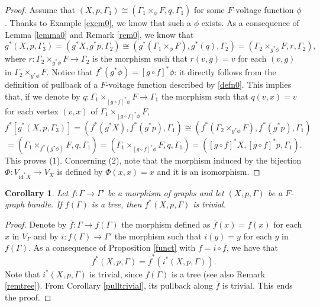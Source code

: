 \documentclass{amsart}
\newtheorem{cor}[theo]{Corollary}
\theoremstyle{definition}
\numberwithin{equation}{section}
\begin{document}
\begin{proof}
Assume that $(X, p, \Gamma_1) \cong (\Gamma_1 \times_\phi F, q, \Gamma_1)$ for some $F$-voltage function $\phi$. Thanks to Example \ref{exem0}, we know that such a $\phi$ exists.
As a consequence of Lemma \ref{lemma0} and Remark \ref{rem0}, we know that
\begin{equation}
g^*(X, p, \Gamma_3) = (g^*X, g^*p, \Gamma_2) \cong (g^*(\Gamma_1 \times_\phi F), g^*(q), \Gamma_2) = (\Gamma_2 \times_{g^*\phi} F, r, \Gamma_2),
\end{equation}
where $r: \Gamma_2 \times_{g^*\phi} F \longrightarrow \Gamma_2$ is the morphism such that $r(v, g) = v$ for each $(v,g)$ in $\Gamma_2 \times_{g^*\phi} F$.
Notice that $f^*(g^*\phi) = [g \circ f]^*\phi$: it directly follows from the definition of pullback of a $F$-voltage function described by \eqref{defn0}. This implies that, if we denote by $q: \Gamma_1 \times_{[g \circ f]^*\phi} F \longrightarrow \Gamma_1$ the morphism such that $q(v, x) = v$ for each vertex $(v,x)$ of $\Gamma_1 \times_{[g \circ f]^*\phi} F$,
\begin{equation}
    f^*[g^*(X, p, \Gamma_3)] = (f^*(g^*X), f^*(g^*p), \Gamma_1) \cong (f^*(\Gamma_2 \times_{g^*\phi} F), f^*(g^*p), \Gamma_1)\end{equation}
 \[   = (\Gamma_1 \times_{f^*(g^*\phi)} F, q, \Gamma_1)    = (\Gamma_1 \times_{[g \circ f]^*\phi} F, q, \Gamma_1) = ([g \circ f]^*X, [g \circ f]^*p, \Gamma_1).\]
This proves (1). Concerning (2), note that the morphism induced by the bijection $\Phi: V_{\mathrm{id}^*X} \longrightarrow V_X$ is defined by $\Phi(x,x)=x$  and it is  an isomorphism.
\end{proof}

\begin{cor}
Let $f: \Gamma \longrightarrow \Gamma'$ be a morphism of graphs and let $(X, p, \Gamma)$ be a $F$-graph bundle. If $f(\Gamma)$ is a tree, then $f^*(X, p, \Gamma)$ is trivial.    
\end{cor}
\begin{proof}
Denote by $\overline{f}:\Gamma \longrightarrow f(\Gamma)$ the morphism defined as $\overline{f}(x) = f(x)$ for each $x$ in $V_\Gamma$ and by $i: f(\Gamma) \longrightarrow \Gamma'$ the morphism such that $i(y) = y$ for each $y$ in $f(\Gamma)$. As a consequence of Proposition \ref{funct} with $f = i \circ \overline{f}$, we have that
\begin{equation}
    f^*(X,p, \Gamma) = \overline{f}^*(i^*(X,p, \Gamma)).
\end{equation}
Note that $i^*(X,p, \Gamma)$ is trivial, since $f(\Gamma)$ is a tree (see also Remark \ref{remtree}). From Corollary \ref{pulltrivial},  its pullback along $\overline{f}$ is trivial. This ends the proof.
\end{proof}
\end{document}
